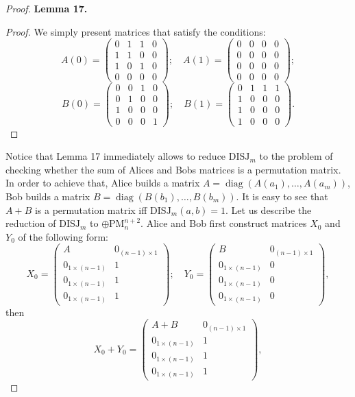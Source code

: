 \documentclass[10pt,a4paper]{article}
\newenvironment{authorclaim}[1]{\par\medskip\noindent\textbf{#1.}\ \ignorespaces}{\par\medskip}
\begin{document}
\begin{proof}
\begin{authorclaim}{Lemma 17}
\end{authorclaim}
\begin{proof}
We simply present matrices that satisfy the conditions:
\[
A(0)=\begin{pmatrix}0&1&1&0\\1&1&0&0\\1&0&1&0\\0&0&0&0\end{pmatrix};
\quad A(1)=\begin{pmatrix}0&0&0&0\\0&0&0&0\\0&0&0&0\\0&0&0&0\end{pmatrix};
\]
\[
B(0)=\begin{pmatrix}0&0&1&0\\0&1&0&0\\1&0&0&0\\0&0&0&1\end{pmatrix};
\quad B(1)=\begin{pmatrix}0&1&1&1\\1&0&0&0\\1&0&0&0\\1&0&0&0\end{pmatrix}.
\]
\end{proof}
Notice that Lemma 17 immediately allows to reduce $\mathrm{DISJ}_m$ to the problem of checking whether the sum of Alices and Bobs matrices is a permutation matrix. In order to achieve that, Alice builds a matrix $A=\operatorname{diag}(A(a_1),\ldots,A(a_m))$, Bob builds a matrix $B=\operatorname{diag}(B(b_1),\ldots,B(b_m))$. It is easy to see that $A+B$ is a permutation matrix iff $\mathrm{DISJ}_m(a,b)=1$.
Let us describe the reduction of $\mathrm{DISJ}_m$ to $\oplus\mathrm{PM}_n^{n+2}$. Alice and Bob first construct matrices $X_0$ and $Y_0$ of the following form:
\[
X_0=\begin{pmatrix}A&0_{(n-1)\times1}\\0_{1\times(n-1)}&1\\0_{1\times(n-1)}&1\\0_{1\times(n-1)}&1\end{pmatrix};
\quad Y_0=\begin{pmatrix}B&0_{(n-1)\times1}\\0_{1\times(n-1)}&0\\0_{1\times(n-1)}&0\\0_{1\times(n-1)}&0\end{pmatrix},
\]
then
\[
X_0+Y_0=\begin{pmatrix}A+B&0_{(n-1)\times1}\\0_{1\times(n-1)}&1\\0_{1\times(n-1)}&1\\0_{1\times(n-1)}&1\end{pmatrix},
\]
\end{proof}
\end{document}
